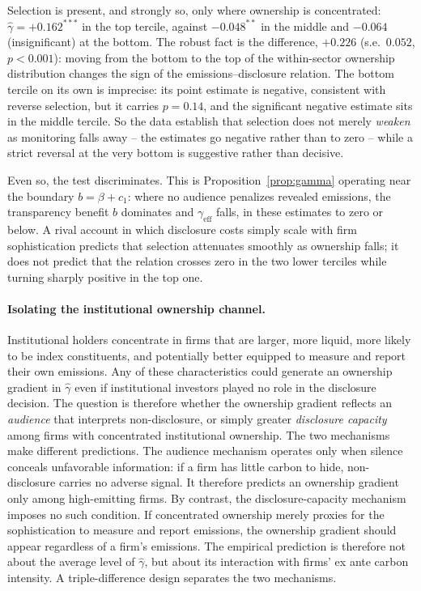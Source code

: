 \documentclass[a4paper,12pt]{article}
\begin{document}
Selection is present, and strongly so, only where ownership is concentrated: $\hat\gamma = +0.162^{***}$ in the top tercile, against $-0.048^{**}$ in the middle and $-0.064$ (insignificant) at the bottom. The robust fact is the difference, $+0.226$ (s.e.\ $0.052$, $p<0.001$): moving from the bottom to the top of the within-sector ownership distribution changes the sign of the emissions--disclosure relation. The bottom tercile on its own is imprecise: its point estimate is negative, consistent with reverse selection, but it carries $p = 0.14$, and the significant negative estimate sits in the middle tercile. So the data establish that selection does not merely \emph{weaken} as monitoring falls away -- the estimates go negative rather than to zero -- while a strict reversal at the very bottom is suggestive rather than decisive.

Even so, the test discriminates. This is Proposition~\ref{prop:gamma} operating near the boundary $b = \beta + c_1$: where no audience penalizes revealed emissions, the transparency benefit $b$ dominates and $\gamma_{\text{eff}}$ falls, in these estimates to zero or below. A rival account in which disclosure costs simply scale with firm sophistication predicts that selection attenuates smoothly as ownership falls; it does not predict that the relation crosses zero in the two lower terciles while turning sharply positive in the top one.


\paragraph{Isolating the institutional ownership channel.} Institutional holders concentrate in firms that are larger, more liquid, more likely to be index constituents, and potentially better equipped to measure and report their own emissions. Any of these characteristics could generate an ownership gradient in $\hat\gamma$ even if institutional investors played no role in the disclosure decision. The question is therefore whether the ownership gradient reflects an \emph{audience} that interprets non-disclosure, or simply greater \emph{disclosure capacity} among firms with concentrated institutional ownership. The two mechanisms make different predictions. The audience mechanism operates only when silence conceals unfavorable information: if a firm has little carbon to hide, non-disclosure carries no adverse signal. It therefore predicts an ownership gradient only among high-emitting firms. By contrast, the disclosure-capacity mechanism imposes no such condition. If concentrated ownership merely proxies for the sophistication to measure and report emissions, the ownership gradient should appear regardless of a firm's emissions. The empirical prediction is therefore not about the average level of $\hat\gamma$, but about its interaction with firms' ex ante carbon intensity. A triple-difference design separates the two mechanisms.
\end{document}
